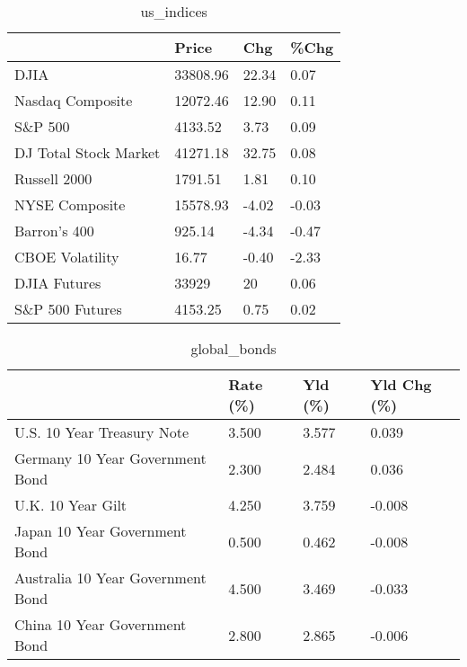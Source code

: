 \documentclass{article}%
\begin{document}
%


\begin{table}[htbp]%
\caption{us\_indices}%
\centering%
\begin{adjustbox}{width=1\textwidth}%
\begin{tabular}{llll}
\toprule
                      &    Price &   Chg &  \%Chg \\
\midrule
                 DJIA & 33808.96 & 22.34 &  0.07 \\
     Nasdaq Composite & 12072.46 & 12.90 &  0.11 \\
              S\&P 500 &  4133.52 &  3.73 &  0.09 \\
DJ Total Stock Market & 41271.18 & 32.75 &  0.08 \\
         Russell 2000 &  1791.51 &  1.81 &  0.10 \\
       NYSE Composite & 15578.93 & -4.02 & -0.03 \\
         Barron's 400 &   925.14 & -4.34 & -0.47 \\
      CBOE Volatility &    16.77 & -0.40 & -2.33 \\
         DJIA Futures &    33929 &    20 &  0.06 \\
      S\&P 500 Futures &  4153.25 &  0.75 &  0.02 \\
\bottomrule
\end{tabular}
%
\end{adjustbox}%
\end{table}

%


\begin{table}[htbp]%
\caption{global\_bonds}%
\centering%
\begin{adjustbox}{width=1\textwidth}%
\begin{tabular}{llll}
\toprule
                                  & Rate (\%) & Yld (\%) & Yld Chg (\%) \\
\midrule
       U.S. 10 Year Treasury Note &    3.500 &   3.577 &       0.039 \\
  Germany 10 Year Government Bond &    2.300 &   2.484 &       0.036 \\
                U.K. 10 Year Gilt &    4.250 &   3.759 &      -0.008 \\
    Japan 10 Year Government Bond &    0.500 &   0.462 &      -0.008 \\
Australia 10 Year Government Bond &    4.500 &   3.469 &      -0.033 \\
    China 10 Year Government Bond &    2.800 &   2.865 &      -0.006 \\
\bottomrule
\end{tabular}
%
\end{adjustbox}%
\end{table}
\end{document}
